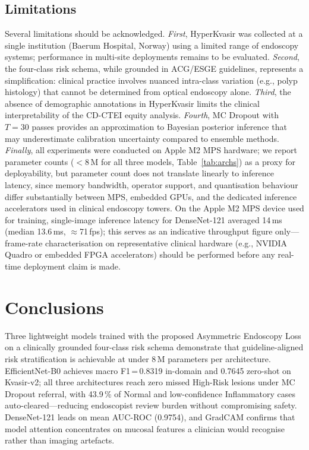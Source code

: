 \documentclass[11pt,a4paper]{article}
\begin{document}
\subsection{Limitations}

Several limitations should be acknowledged. \emph{First}, HyperKvasir was
collected at a single institution (Baerum Hospital, Norway) using a limited
range of endoscopy systems; performance in multi-site deployments remains to
be evaluated. \emph{Second}, the four-class risk schema, while grounded in
ACG/ESGE guidelines, represents a simplification: clinical practice involves
nuanced intra-class variation (e.g., polyp histology) that cannot be
determined from optical endoscopy alone. \emph{Third}, the absence of
demographic annotations in HyperKvasir limits the clinical interpretability
of the CD-CTEI equity analysis. \emph{Fourth}, MC Dropout with $T=30$ passes
provides an approximation to Bayesian posterior inference that may
underestimate calibration uncertainty compared to ensemble methods.
\emph{Finally}, all experiments were conducted on Apple M2 MPS hardware; we
report parameter counts ($<$8\,M for all three models, Table~\ref{tab:archs})
as a proxy for deployability, but parameter count does not translate linearly
to inference latency, since memory bandwidth, operator support, and
quantisation behaviour differ substantially between MPS, embedded GPUs, and
the dedicated inference accelerators used in clinical endoscopy towers.
On the Apple M2 MPS device used for training, single-image inference latency
for DenseNet-121 averaged 14\,ms (median 13.6\,ms, $\approx$71\,fps); this
serves as an indicative throughput figure only---frame-rate characterisation
on representative clinical hardware (e.g., NVIDIA Quadro or embedded FPGA
accelerators) should be performed before any real-time deployment claim is made.

\section{Conclusions}
\label{sec:conclusions}

Three lightweight models trained with the proposed Asymmetric Endoscopy
Loss on a clinically grounded four-class risk schema demonstrate that
guideline-aligned risk stratification is achievable at under 8\,M
parameters per architecture. EfficientNet-B0 achieves macro
F1\,=\,0.8319 in-domain and 0.7645 zero-shot on Kvasir-v2; all three
architectures reach zero missed High-Risk lesions under MC Dropout
referral, with 43.9\,\% of Normal and low-confidence Inflammatory
cases auto-cleared---reducing endoscopist review burden without
compromising safety. DenseNet-121 leads on mean AUC-ROC (0.9754),
and GradCAM confirms that model attention concentrates on mucosal
features a clinician would recognise rather than imaging artefacts.
\end{document}
